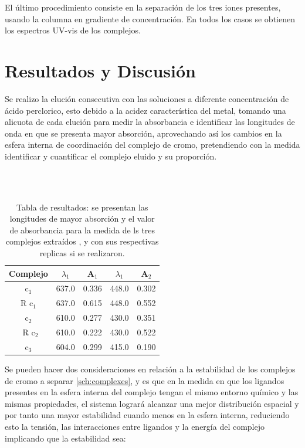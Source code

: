 \documentclass[fleqn,10pt]{SelfArx} %
\begin{document}
	El \'ultimo procedimiento consiste en la separaci\'on de los tres iones presentes, usando la columna en gradiente de concentraci\'on. En todos los casos se obtienen los espectros UV-vis de los complejos. 
	
	\section{Resultados y Discusi\'on}
	
	Se realizo la elución consecutiva con las soluciones a diferente concentración de ácido perclorico, esto debido a la acidez característica del metal, tomando una alicuota de cada elución para medir la absorbancia e identificar las longitudes de onda en que se presenta mayor absorción, aprovechando así los cambios en la esfera interna de coordinación del complejo de cromo, pretendiendo con la medida identificar y cuantificar el complejo eluido y su proporción.
	
\begin{table}[h]
\centering
\caption{Tabla de resultados: se presentan las longitudes de mayor absorción y el valor de absorbancia para la medida de ls tres complejos extraídos ,  y  con sus respectivas replicas si se realizaron.}\\

\label{t1}
\\
\begin{tabular}{c|cccc}
\hline
\textbf{Complejo} & $\lambda_{1}$ & A$_{1}$ & $\lambda_{1}$  & A$_{2}$ \\\hline
c$_1$ & 637.0 &0.336  &448.0  &0.302  \\
R c$_1$& 637.0 &0.615  &448.0  &0.552  \\
c$_2$ & 610.0 &0.277  &430.0  &0.351  \\\
R c$_2$& 610.0 &0.222  &430.0  &0.522  \\
c$_3$ & 604.0 &0.299  &415.0  &0.190  \\\hline
\end{tabular}
\end{table}

Se pueden hacer dos consideraciones en relación a la estabilidad de los complejos de cromo a separar \autoref{sch:complexes}, y es que en la medida en que los ligandos presentes en la esfera interna del complejo tengan el mismo entorno químico y las mismas propiedades, el sistema logrará alcanzar una mejor distribución espacial y por tanto una mayor estabilidad cuando menos en la esfera interna, reduciendo esto la tensión, las interacciones entre ligandos y la energía del complejo implicando que la estabilidad sea:
\end{document}
